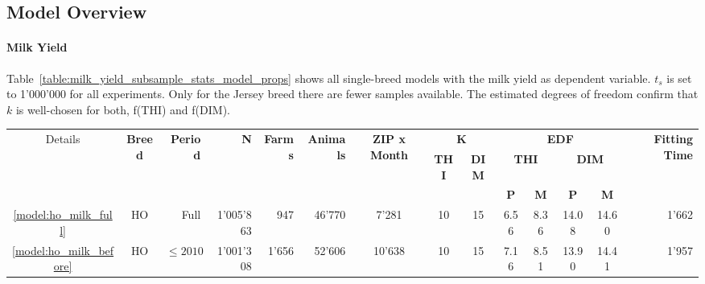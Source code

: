 \newpage
\begin{landscape} %
    \thispagestyle{empty}
\section{Model Overview}\label{sec:model_overview}
\paragraph{Milk Yield} Table~\ref{table:milk_yield_subsample_stats_model_props} shows all single-breed models with the milk yield as dependent variable. $t_s$ is set to 1'000'000 for all experiments. Only for the Jersey breed there are fewer samples available. The estimated degrees of freedom confirm that $k$ is well-chosen for both, f(THI) and f(DIM).
    \begin{table}[H]
        \centering
        \begin{tabular}{c c r r r r c c c c c c c r}
            \toprule
            \multirow{3}{*}{Details} &
            \multirow{3}{*}{\textbf{Breed}} &
            \multirow{3}{*}{\textbf{Period}} &
            \multirow{3}{*}{\textbf{N}} &
            \multirow{3}{*}{\textbf{Farms}} &
            \multirow{3}{*}{\textbf{Animals}} &
            \multirow{3}{*}{\textbf{ZIP x Month}} &
            \multicolumn{2}{c}{\textbf{K}} &
            \multicolumn{4}{c}{\textbf{EDF}} &
            \multirow{3}{*}{\textbf{Fitting Time}} \\
            \cmidrule(lr){8-9} \cmidrule(lr){10-13}
            & & & & & & &
            \textbf{THI} & \textbf{DIM} &
            \multicolumn{2}{c}{\textbf{THI}} &
            \multicolumn{2}{c}{\textbf{DIM}} \\
            \cmidrule(lr){10-11} \cmidrule(lr){12-13}
            & & & & & & & & & \textbf{P} & \textbf{M} & \textbf{P} & \textbf{M} &\\
            \hline
            \hline
            \textcolor{blue}{\ref{model:ho_milk_full}}& HO & Full & 1'005'863 & 947 & 46'770 & 7'281 & 10 & 15 & 6.56 & 8.36 & 14.08 & 14.60 & 1'662\\
            \textcolor{blue}{\ref{model:ho_milk_before}}& HO & $\leq2010$ & 1'001'308 & 1'656 & 52'606 & 10'638 & 10 & 15 & 7.16 & 8.51 & 13.90 & 14.41 & 1'957\\

\end{tabular}
\end{table}
\end{landscape}

